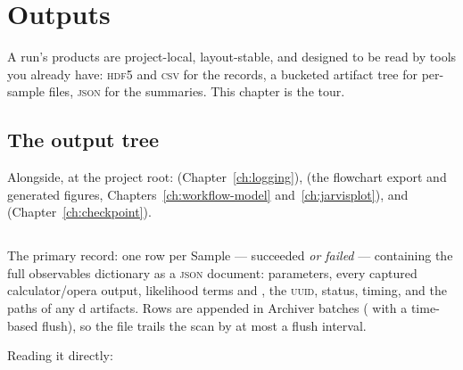\chapter{Outputs}
\label{ch:outputs}

 A run's products are
project-local, layout-stable, and designed to be read by tools you already have:
\textsc{hdf5} and \textsc{csv} for the records, a bucketed artifact tree for per-sample
files, \textsc{json} for the summaries. This chapter is the tour.

\section{The output tree}
\label{sec:output-tree}

\begin{jfiletree}
\end{jfiletree}

Alongside, at the project root:  (Chapter~\ref{ch:logging}),
 (the flowchart export and generated figures,
Chapters~\ref{ch:workflow-model} and~\ref{ch:jarvisplot}), and
 (Chapter~\ref{ch:checkpoint}).

\section{}
\label{sec:database-hdf5}

The primary record: one row per Sample --- succeeded \emph{or failed} --- containing the
full observables dictionary as a \textsc{json} document: parameters, every captured
calculator/opera output, likelihood terms and , the \textsc{uuid}, status,
timing, and the paths of any d artifacts. Rows are appended in Archiver
batches ( with a time-based flush), so the file trails the
scan by at most a flush interval.

Reading it directly:

